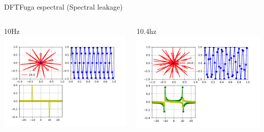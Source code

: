 \begin{frame}{DFT}{Fuga espectral (Spectral leakage)}
   \handsonicon
   \begin{columns}[c]
      \begin{column}{.5\textwidth}
         10Hz
         \centering\includegraphics[width=1.0\textwidth]{3_clase/desparramo2}
      \end{column}
      \begin{column}{.5\textwidth}
         10.4hz
         \centering\includegraphics[width=1.0\textwidth]{3_clase/desparramo1}
      \end{column}
   \end{columns}
   \vfill
\end{frame}
